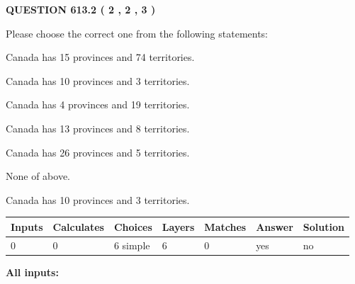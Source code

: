 \documentclass[12pt]{article}
\begin{document}
   
  
\vspace{0.2in}
  
{\textbf{\Large{QUESTION
613.2 
 ( 2 , 2 , 3 )
}}}
  
  
Please choose the correct one from the following statements:
 
 
Canada has  15 provinces and  74 territories.
 
 
Canada has 10  provinces and 3 territories.
 
 
Canada has   4 provinces and  19 territories.
 
 
Canada has  13 provinces and  8 territories.
 
 
Canada has  26 provinces and  5 territories.
 
 
 None of above.
 
 
\noindent{}
 
 
Canada has 10  provinces and 3 territories.
 
 
\noindent{}
 
 
   
   
   
   
\noindent\begin{tabular}{|l|l|l|l|l|l|l|}
 \hline
Inputs & Calculates & Choices & Layers & Matches & Answer & Solution \\ \hline
 0  & 
 0  & 
 6
  simple  
  & 
 6  & 
 0  & 
  yes & 
  no 
  \\ \hline
 \end{tabular}
   
   
   
   
\noindent{}
   
   
   
   
\noindent\vspace{0.1in}\hspace{-0.08in} {\textbf{\Large{All inputs: }}}
   
   
   
   
   
   
 \vspace{0.2in}
 
\end{document}
